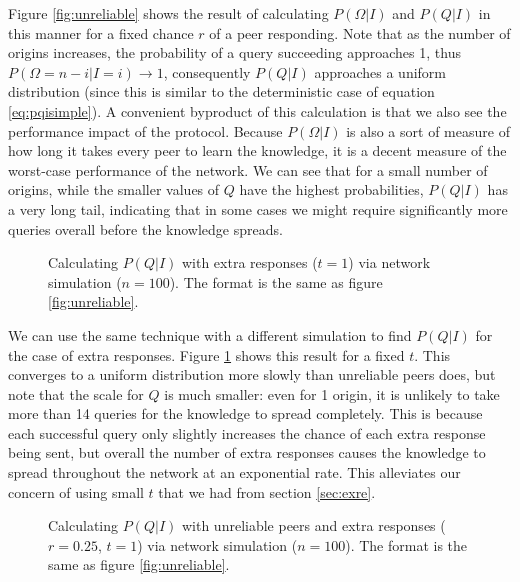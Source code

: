 \documentclass{article}
\newcommand{\eqnref}[1]{equation \eqref{eq:#1}}
\newcommand{\secref}[1]{section \ref{sec:#1}}
\newcommand{\figref}[1]{figure \ref{fig:#1}}
\newcommand{\Figref}[1]{Figure \ref{fig:#1}}
\begin{document}
\Figref{unreliable} shows the result of
calculating $P(\Omega|I)$ and $P(Q|I)$ in this manner for a fixed chance $r$ of
a peer responding. Note that as the number of origins increases, the probability
of a query succeeding approaches 1, thus $P(\Omega=n-i|I=i)\rightarrow 1$,
consequently $P(Q|I)$ approaches a uniform distribution (since this is similar
to the deterministic case of \eqnref{pqisimple}). A convenient byproduct of this
calculation is that we also see the performance impact of the protocol.
Because $P(\Omega|I)$ is also a sort of measure of how long it takes every peer
to learn the knowledge, it is a decent measure of the worst-case performance of
the network. We can see that for a small number of origins, while the smaller
values of $Q$ have the highest probabilities, $P(Q|I)$ has a very long tail,
indicating that in some cases we might require significantly more queries
overall before the knowledge spreads.

\begin{figure}%
    \centering
	\caption{Calculating $P(Q|I)$ with extra responses ($t=1$) via network
	simulation ($n=100$). The format is the same as \figref{unreliable}.}
    \label{fig:exre}%
\end{figure}

We can use the same technique with a different simulation to find $P(Q|I)$ for
the case of extra responses. \Figref{exre} shows this result for a fixed $t$.
This converges to a uniform distribution more slowly than unreliable peers does,
but note that the scale for $Q$ is much smaller: even for 1 origin, it is
unlikely to take more than 14 queries for the knowledge to spread completely.
This is because each successful query only slightly increases the chance of each
extra response being sent, but overall the number of extra responses causes the
knowledge to spread throughout the network at an exponential rate. This
alleviates our concern of using small $t$ that we had from \secref{exre}.

\begin{figure}%
    \centering
	\caption{Calculating $P(Q|I)$ with unreliable peers and extra responses
	($r=0.25$, $t=1$) via network simulation ($n=100$). The format is the same
	as \figref{unreliable}.}
    \label{fig:uexre}%
\end{figure}
\end{document}
